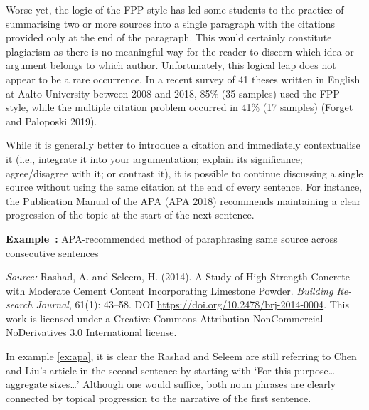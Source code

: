 \documentclass[english, 12pt, a4paper, elec, utf8, a-2b, online]{aaltothesis}
\begin{document}
Worse yet, the logic of the FPP style has led some students to the practice of 
summarising two or more sources into a single paragraph with the citations 
provided only at the end of the paragraph. This would certainly constitute 
plagiarism as there is no meaningful way for the reader to discern which idea or
argument belongs to which author. Unfortunately, this logical leap does not 
appear to be a rare occurrence. In a recent survey of 41 theses written in 
English at Aalto University between 2008 and 2018, 85\% (35 samples) used the 
FPP style, while the multiple citation problem occurred in 41\% (17 samples) 
(Forget and Paloposki 2019).

While it is generally better to introduce a citation and immediately 
contextualise it (i.e., integrate it into your argumentation; explain its 
significance; agree/disagree with it; or contrast it), it is possible to 
continue discussing a single source without using the same citation at the end 
of every sentence. For instance, the Publication Manual of the APA (APA 2018) 
recommends maintaining a clear progression of the topic at the start of the next
sentence.

\vspace{1em}
\noindent
{}
\textsf{\textbf{Example~\theexample:}} \label{ex:apa}APA-recommended method of 
paraphrasing same source across consecutive sentences 

\vspace{1ex}
\noindent
{}

\vspace{1ex}
\noindent
\textit{Source:} Rashad, A. and Seleem, H. (2014). A Study of High Strength 
Concrete with Moderate Cement Content Incorporating Limestone Powder. 
\textit{Building Re-search Journal}, 61(1): 43--58. 
DOI \url{https://doi.org/10.2478/brj-2014-0004}. 
This work is licensed under a Creative Commons 
Attribution-NonCommercial-NoDerivatives 3.0 International license.

\vspace{1em}
In example \ref{ex:apa}, it is clear the Rashad and Seleem are still referring 
to Chen and Liu’s article in the second sentence by starting with ‘For this 
purpose\ldots aggregate sizes\ldots’ Although one would suffice, both noun 
phrases are clearly connected by topical progression to the narrative of the 
first sentence.
\end{document}
